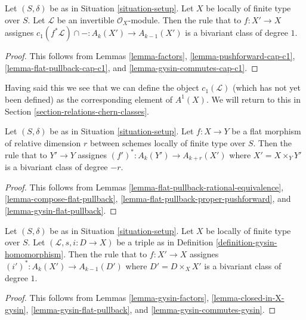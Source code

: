 \begin{lemma}
\label{lemma-cap-c1-bivariant}
Let $(S, \delta)$ be as in Situation \ref{situation-setup}.
Let $X$ be locally of finite type over $S$.
Let $\mathcal{L}$ be an invertible $\mathcal{O}_X$-module.
Then the rule that to $f : X' \to X$ assignes
$c_1(f^*\mathcal{L}) \cap - : A_k(X') \to A_{k - 1}(X')$
is a bivariant class of degree $1$.
\end{lemma}

\begin{proof}
This follows from Lemmas \ref{lemma-factors},
\ref{lemma-pushforward-cap-c1},
\ref{lemma-flat-pullback-cap-c1}, and
\ref{lemma-gysin-commutes-cap-c1}.
\end{proof}

\noindent
Having said this we see that we can define the object $c_1(\mathcal{L})$
(which has not yet been defined) as the corresponding element of $A^1(X)$.
We will return to this in Section \ref{section-relations-chern-classes}.

\begin{lemma}
\label{lemma-flat-pullback-bivariant}
Let $(S, \delta)$ be as in Situation \ref{situation-setup}.
Let $f : X \to Y$ be a flat morphism of relative dimension $r$
between schemes locally of finite type over $S$.
Then the rule that to $Y' \to Y$ assignes
$(f')^* : A_k(Y') \to A_{k + r}(X')$ where $X' = X \times_Y Y'$
is a bivariant class of degree $-r$.
\end{lemma}

\begin{proof}
This follows from
Lemmas \ref{lemma-flat-pullback-rational-equivalence},
\ref{lemma-compose-flat-pullback},
\ref{lemma-flat-pullback-proper-pushforward}, and
\ref{lemma-gysin-flat-pullback}.
\end{proof}

\begin{lemma}
\label{lemma-gysin-bivariant}
Let $(S, \delta)$ be as in Situation \ref{situation-setup}.
Let $X$ be locally of finite type over $S$.
Let $(\mathcal{L}, s, i : D \to X)$ be a triple as in
Definition \ref{definition-gysin-homomorphism}.
Then the rule that to $f : X' \to X$ assignes
$(i')^* : A_k(X') \to A_{k - 1}(D')$ where $D' = D \times_X X'$
is a bivariant class of degree $1$.
\end{lemma}

\begin{proof}
This follows from Lemmas \ref{lemma-gysin-factors},
\ref{lemma-closed-in-X-gysin},
\ref{lemma-gysin-flat-pullback}, and
\ref{lemma-gysin-commutes-gysin}.
\end{proof}

